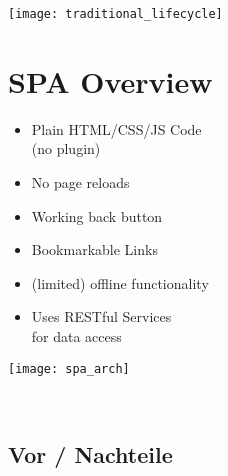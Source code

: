 

\newcommand{\TITLE}{Web Engineering 3}
\newcommand{\AUTHOR}{Mona Panchaud}
\newcommand{\INSTITUTE}{Ostschweizer Fachhochschule}


\begin{multicols*}{4}

\texttt{[image: traditional\_lifecycle]}

\section{SPA Overview}

\begin{minipage}[c]{.6\linewidth}
    \begin{itemize}
        \item Plain HTML/CSS/JS Code \\(no plugin)
        \item No page reloads
        \item Working back button
        \item Bookmarkable Links
        \item (limited) offline functionality
        \item Uses RESTful Services \\for data access
    \end{itemize}
\end{minipage}%
\begin{minipage}[c]{.4\linewidth}
    \texttt{[image: spa\_arch]}
\end{minipage}%
\\ %

\subsection{Vor / Nachteile}


\end{multicols*}
